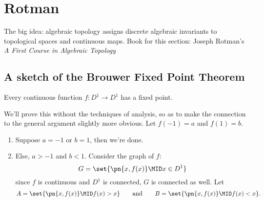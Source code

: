 \chapter{Rotman}
The big idea: algebraic topology assigns discrete algebraic invariants to
topological spaces and continuous maps. Book for this section: Joseph Rotman's
\emph{A First Course in Algebraic Topology}

\section{A sketch of the Brouwer Fixed Point Theorem}
\begin{problem}[R 0.1]
  Every continuous function $f : D^1 \to D^1$ has a fixed point.
\end{problem}
\begin{solution}
  We'll prove this without the techniques of analysis, so as to make the
  connection to the general argument slightly more obvious. Let $f(-1) = a$ and
  $f(1) = b$.
  \begin{enumerate}[label=(\arabic*)]
    \item Suppose $a = -1$ or $b = 1$, then we're done.
    \item Else, $a > -1$ and $b < 1$. Consider the graph of $f$:
      \[
        G = \set{\pn{x, f(x)} \MID x \in D^1}
      \]
      since $f$ is continuous and $D^1$ is connected, $G$ is connected as well.
      Let
      \[
        A = \set{\pn{x, f(x)} \MID f(x) > x} \qquad \text{and} \qquad B =
        \set{\pn{x, f(x)} \MID f(x) < x}.
      \]
      \begin{figure}[H]
        \centering
\end{figure}
\end{enumerate}
\end{solution}
